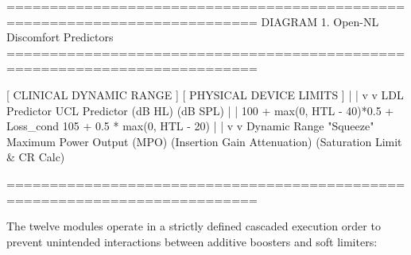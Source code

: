 \documentclass[
  12pt,
]{article}
\newenvironment{Shaded}{}{}
\newcommand{\NormalTok}[1]{#1}
\begin{document}
\begin{Shaded}
\begin{Highlighting}[]
\NormalTok{===========================================================================}
\NormalTok{                  DIAGRAM 1. Open{-}NL Discomfort Predictors}
\NormalTok{===========================================================================}

\NormalTok{       [ CLINICAL DYNAMIC RANGE ]          [ PHYSICAL DEVICE LIMITS ]}
\NormalTok{                   |                                   |}
\NormalTok{                   v                                   v}
\NormalTok{             LDL Predictor                       UCL Predictor}
\NormalTok{                (dB HL)                            (dB SPL)}
\NormalTok{                   |                                   |}
\NormalTok{    100 + max(0, HTL {-} 40)*0.5 + Loss\_cond    105 + 0.5 * max(0, HTL {-} 20)}
\NormalTok{                   |                                   |}
\NormalTok{                   v                                   v}
\NormalTok{        Dynamic Range "Squeeze"            Maximum Power Output (MPO) }
\NormalTok{      (Insertion Gain Attenuation)       (Saturation Limit \& CR Calc)}

\NormalTok{===========================================================================}
\end{Highlighting}
\end{Shaded}

The twelve modules operate in a strictly defined cascaded execution
order to prevent unintended interactions between additive boosters and
soft limiters:
\end{document}
